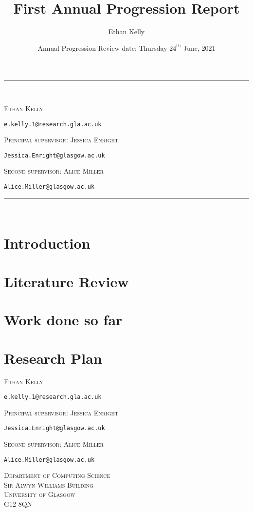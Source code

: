 \documentclass[11pt,a4paper]{article}
\title{{\bf First Annual Progression Report}}
\author{Ethan Kelly}
\date{Annual Progression Review date: Thursday $24^{\text{th}}$ June, 2021}
\makeatletter
\theoremstyle{definition}
\newcommand{\makenames}{{
  \bigskip
  \footnotesize
  \textsc{Ethan Kelly} \par\nopagebreak
  	\hspace{3\parindent}\texttt{e.kelly.1@research.gla.ac.uk}\par\nopagebreak
	\vspace{3mm}
  \textsc{Principal supervisor: Jessica Enright}\par\nopagebreak
  	\hspace{3\parindent}\texttt{Jessica.Enright@glasgow.ac.uk}\par\nopagebreak
	\vspace{3mm}
  \textsc{Second supervisor: Alice Miller}\par\nopagebreak
  	\hspace{3\parindent}\texttt{Alice.Miller@glasgow.ac.uk}\par\nopagebreak
	\vspace{1mm}
}}
\newcommand{\makeaddress}{{
  \makenames
  \footnotesize
	\begin{flushright}
      \textsc{Department of Computing Science\\Sir Alwyn Williams Building\\University of Glasgow\\G12 8QN}
    \end{flushright}
}}
\makeatother
\begin{document}
\maketitle
{\centering
 \noindent\rule{10cm}{0.6pt}\\
 \makenames
 \noindent\rule{10cm}{0.6pt}\\
}
\tableofcontents
\newpage

\section{Introduction}
\label{sec:intro}




\section{Literature Review}
\label{sec:lit}




\section{Work done so far}
\label{sec:work}




\section{Research Plan}
\label{sec:plan}




\newpage



\vspace*{\fill}

\makeaddress
\end{document}
